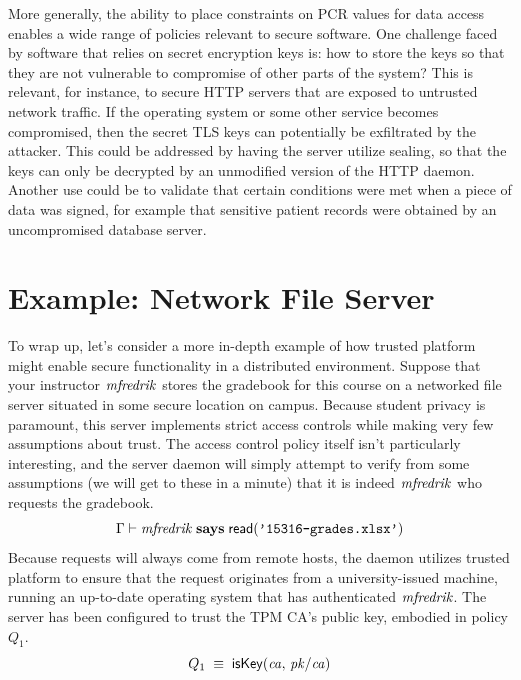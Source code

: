 \documentclass[11pt]{article}
\newcommand{\pk}[1]{\ensuremath{\mi{pk/#1}}}
\newcommand{\iskey}[2]{\ms{isKey}(#1,\, #2)}
\newcommand{\readf}[1]{\ms{read}(#1)}
\begin{document}
More generally, the ability to place constraints on PCR values for data access enables a wide range of policies relevant to secure software. One challenge faced by software that relies on secret encryption keys is: how to store the keys so that they are not vulnerable to compromise of other parts of the system? This is relevant, for instance, to secure HTTP servers that are exposed to untrusted network traffic. If the operating system or some other service becomes compromised, then the secret TLS keys can potentially be exfiltrated by the attacker. This could be addressed by having the server utilize sealing, so that the keys can only be decrypted by an unmodified version of the HTTP daemon. Another use could be to validate that certain conditions were met when a piece of data was signed, for example that sensitive patient records were obtained by an uncompromised database server.

\section{Example: Network File Server}

To wrap up, let's consider a more in-depth example of how trusted platform might enable secure functionality in a distributed environment. Suppose that your instructor $\mathit{mfredrik}$ stores the gradebook for this course on a networked file server situated in some secure location on campus. Because student privacy is paramount, this server implements strict access controls while making very few assumptions about trust. The access control policy itself isn't particularly interesting, and the server daemon will simply attempt to verify from some assumptions (we will get to these in a minute) that it is indeed $\mathit{mfredrik}$ who requests the gradebook.
\[
  \Gamma \vdash \mi{mfredrik} \says \readf{\texttt{'15316-grades.xlsx'}}
\]
Because requests will always come from remote hosts, the daemon utilizes trusted platform to ensure that the request originates from a university-issued machine, running an up-to-date operating system that has authenticated $\mathit{mfredrik}$. The server has been configured to trust the TPM CA's public key, embodied in policy $Q_1$.
\[
  Q_1 \;\equiv\; \iskey{\mi{ca}}{\pk{ca}}
\]
\end{document}
